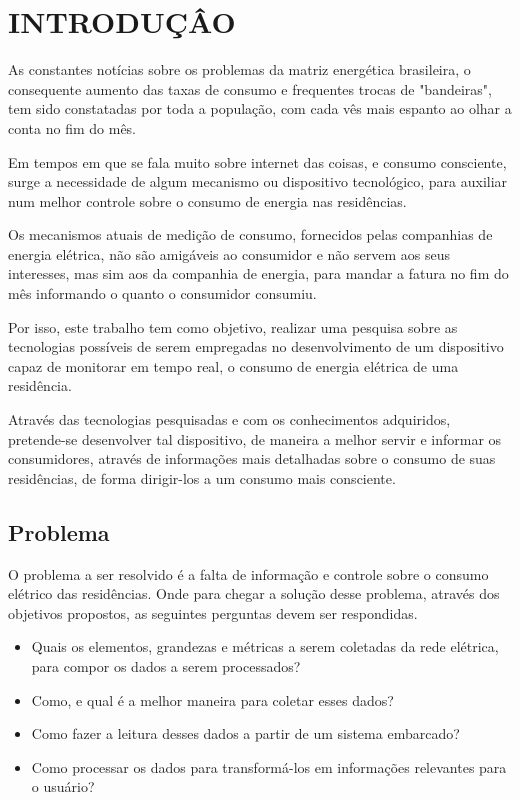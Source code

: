 \chapter{INTRODUÇÂO}
As constantes notícias sobre os problemas da matriz energética brasileira, o consequente aumento das taxas de consumo e frequentes trocas de "bandeiras", tem sido constatadas por toda a população, com cada vês mais espanto ao olhar a conta no fim do mês.

Em tempos em que se fala muito sobre internet das coisas, e consumo consciente, surge a necessidade de algum mecanismo ou dispositivo tecnológico, para auxiliar num melhor controle sobre o consumo de energia nas residências.

Os mecanismos atuais de medição de consumo, fornecidos pelas companhias de energia elétrica, não são amigáveis ao consumidor e não servem aos seus interesses, mas sim aos da companhia de energia, para mandar a fatura no fim do mês informando o quanto o consumidor consumiu. 

Por isso, este trabalho tem como objetivo, realizar uma pesquisa sobre as tecnologias possíveis de serem empregadas no desenvolvimento de um dispositivo capaz de monitorar em tempo real, o consumo de energia elétrica de uma residência.

Através das tecnologias pesquisadas e com os conhecimentos adquiridos, pretende-se desenvolver tal dispositivo, de maneira a melhor servir e informar os consumidores, através de informações mais detalhadas sobre o consumo de suas residências, de forma dirigir-los a um consumo mais consciente.

\section{Problema}
O problema a ser resolvido é a falta de informação e controle sobre o consumo elétrico das residências. Onde para chegar a solução desse problema, através dos objetivos propostos, as seguintes perguntas devem ser respondidas.

\begin{itemize}
    \item Quais os elementos, grandezas e métricas a serem coletadas da rede elétrica, para compor os dados a serem processados?
    \item Como, e qual é a melhor maneira para coletar esses dados?
    \item Como fazer a leitura desses dados a partir de um sistema embarcado?
    \item Como processar os dados para transformá-los em informações relevantes para o usuário?
\end{itemize}

